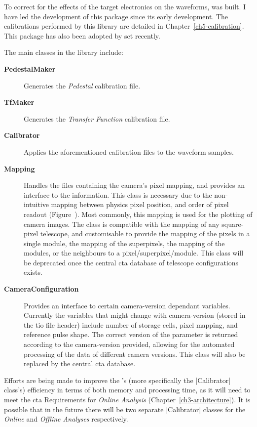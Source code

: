 To correct for the effects of the \gls{target} electronics on the waveforms,  was built. I have led the development of this package since its early development. The calibrations performed by this library are detailed in Chapter~\ref{ch5-calibration}. This package has also been adopted by \gls{sct} recently.

The main classes in the library include:

\lstset{language=C++}
\begin{description}
\item [\textbf{PedestalMaker}] Generates the \textit{Pedestal} calibration file.
\item [\textbf{TfMaker}] Generates the \textit{Transfer Function} calibration file.
\item [\textbf{Calibrator}] Applies the aforementioned calibration files to the waveform samples.
\item [\textbf{Mapping}] Handles the files containing the camera's pixel mapping, and provides an interface to the information. This class is necessary due to the non-intuitive mapping between physics pixel position, and order of pixel readout (Figure~). Most commonly, this mapping is used for the plotting of camera images. The class is compatible with the mapping of any square-pixel telescope, and customisable to provide the mapping of the pixels in a single module, the mapping of the superpixels, the mapping of the modules, or the neighbours to a pixel/superpixel/module. This class will be deprecated once the central \gls{cta} database of telescope configurations exists.
\item [\textbf{CameraConfiguration}] Provides an interface to certain camera-version dependant variables. Currently the variables that might change with camera-version (stored in the \gls{tio} file header) include number of storage cells, pixel mapping, and reference pulse shape. The correct version of the parameter is returned according to the camera-version provided, allowing for the automated processing of the data of different camera versions. This class will also be replaced by the central \gls{cta} database.
\end{description}

Efforts are being made to improve the 's (more specifically the |Calibrator| class's) efficiency in terms of both memory and processing time, as it will need to meet the \gls{cta} Requirements for \textit{Online Analysis} (Chapter~\ref{ch3-architecture}). It is possible that in the future there will be two separate |Calibrator| classes for the \textit{Online} and \textit{Offline Analyses} respectively.

